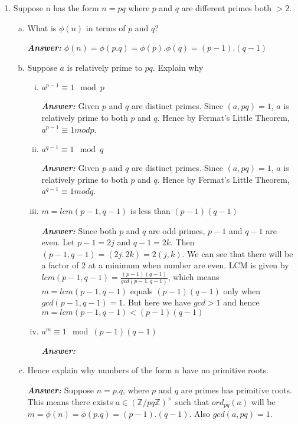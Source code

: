 \documentclass[11pt,a4paper,fleqn]{article}
\begin{document}
\begin{enumerate}[1.]
		\item Suppose n has the form $n = pq$ where $p$ and $q$ are different primes both $> 2$. \\

		\begin{enumerate}[(a)]
			\item What is $\phi(n)$ in terms of $p$ and $q$?
			\begin{flushleft}
				\textbf{\textit{Answer:}} $\phi(n) = \phi(p.q) = \phi(p).\phi(q) = (p-1).(q-1)$
			\end{flushleft}
			\item Suppose $a$ is relatively prime to $pq$.  Explain why
			\begin{enumerate}[i.]
				\item $a^{p-1} \equiv 1\mod p$
				\begin{flushleft}
					\textbf{\textit{Answer:}} Given $p$ and $q$ are distinct primes. Since $(a, pq) = 1$, $a$ is relatively prime to both $p$ and $q$. Hence by Fermat's Little Theorem, $a^{p-1} \equiv 1 mod p$.
				\end{flushleft}
				\item $a^{q-1} \equiv 1\mod q$
				\begin{flushleft}
					\textbf{\textit{Answer:}} Given $p$ and $q$ are distinct primes. Since $(a, pq) = 1$, $a$ is relatively prime to both $p$ and $q$. Hence by Fermat's Little Theorem, $a^{q-1} \equiv 1 mod q$.
				\end{flushleft}
				\item \label{item:Q3biii} $m = lcm(p-1, q-1)$ is less than $(p-1)(q-1)$
				\begin{flushleft}
					\textbf{\textit{Answer:}} Since both $p$ and $q$ are odd primes, $p-1$ and $q-1$ are even. Let $p - 1 = 2j$ and $q - 1 = 2k$. Then $(p-1, q-1) = (2j, 2k) = 2(j, k)$. We can see that there will be a factor of $2$ at a minimum when number are even. LCM is given by $lcm(p - 1, q - 1) = \frac{(p-1)(q-1)}{gcd(p-1, q-1)}$, which means $m = lcm(p-1, q-1)$ equals $(p-1)(q-1)$ only when $gcd(p-1, q-1) = 1$. But here we have $gcd > 1$ and hence $m = lcm(p-1, q-1) < (p-1)(q-1)$
				\end{flushleft}
				\item $a^m \equiv 1 \mod (p-1)(q-1)$
				\begin{flushleft}
					\textbf{\textit{Answer:}}
				\end{flushleft}
			\end{enumerate}
			\item Hence explain why numbers of the form n have no primitive roots.
			\begin{flushleft}
				\textbf{\textit{Answer:}} Suppose $n = p.q$, where $p$ and $q$ are primes has primitive roots. This means there exists $a \in (\mathbb{Z}/pq\mathbb{Z})^\times$ such that $ord_{pq}(a)$ will be $m = \phi(n) = \phi(p.q) = (p - 1).(q - 1)$. Also $gcd(a, pq) = 1$.
				\bigbreak


\end{flushleft}
\end{enumerate}
\end{enumerate}
\end{document}
